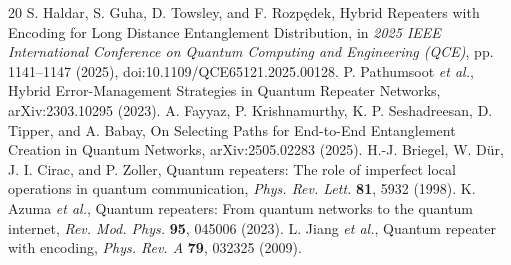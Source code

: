 \documentclass[aps,prx,reprint,superscriptaddress,nofootinbib,longbibliography,floatfix]{revtex4-2}
\begin{document}
\begin{thebibliography}{20}
 S. Haldar, S. Guha, D. Towsley, and F. Rozp\k{e}dek, Hybrid Repeaters with Encoding for Long Distance Entanglement Distribution, in \emph{2025 IEEE International Conference on Quantum Computing and Engineering (QCE)}, pp. 1141--1147 (2025), doi:10.1109/QCE65121.2025.00128.
 P. Pathumsoot \emph{et al.}, Hybrid Error-Management Strategies in Quantum Repeater Networks, arXiv:2303.10295 (2023).
 A. Fayyaz, P. Krishnamurthy, K. P. Seshadreesan, D. Tipper, and A. Babay, On Selecting Paths for End-to-End Entanglement Creation in Quantum Networks, arXiv:2505.02283 (2025).
 H.-J. Briegel, W. D\"ur, J. I. Cirac, and P. Zoller, Quantum repeaters: The role of imperfect local operations in quantum communication, \emph{Phys. Rev. Lett.} \textbf{81}, 5932 (1998).
 K. Azuma \emph{et al.}, Quantum repeaters: From quantum networks to the quantum internet, \emph{Rev. Mod. Phys.} \textbf{95}, 045006 (2023).
 L. Jiang \emph{et al.}, Quantum repeater with encoding, \emph{Phys. Rev. A} \textbf{79}, 032325 (2009).
\end{thebibliography}
\end{document}
